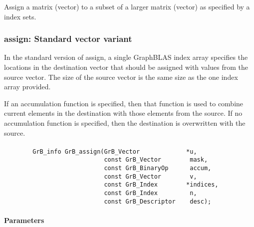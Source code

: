 Assign a matrix (vector) to a subset  of a larger matrix (vector) as specified by a index sets.




\subsubsection{{\sf assign}: Standard vector variant}

In the standard version of {\sf assign}, a single GraphBLAS index array specifies
the locations in the destination vector that should be assigned with values
from the source vector.  The size of the source vector is the same size as the one
index array provided.

If an accumulation function is specified, then that function is used
to combine current elements in the destination with those elements
from the source.  If no accumulation function is specified, then the
destination is overwritten with the source.


\paragraph{\syntax}

\begin{verbatim}
        GrB_info GrB_assign(GrB_Vector             *u,
                            const GrB_Vector        mask,
                            const GrB_BinaryOp      accum,
                            const GrB_Vector        v,
                            const GrB_Index        *indices,
                            const GrB_Index         n,
                            const GrB_Descriptor    desc);
\end{verbatim}

\paragraph{Parameters}


